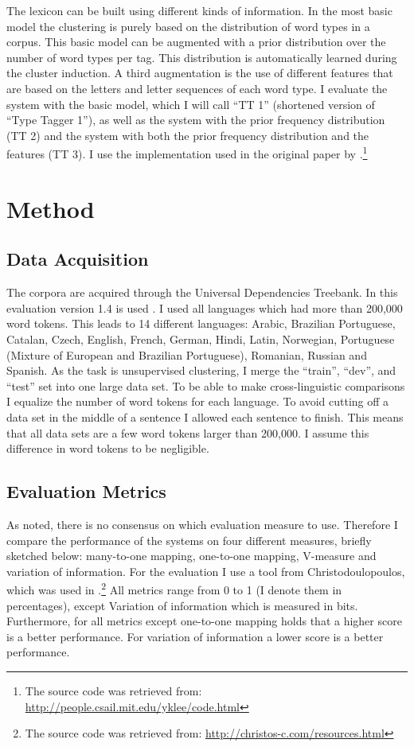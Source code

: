 \documentclass[11pt]{article}
\begin{document}
{The lexicon can be built using different kinds of information. In the most basic model the clustering is purely based on the distribution of word types in a corpus. This basic model can be augmented with a prior distribution over the number of word types per tag. This distribution is automatically learned during the cluster induction. A third augmentation is the use of different features that are based on the letters and letter sequences of each word type. I evaluate the system with the basic model, which I will call ``TT 1'' (shortened version of ``Type Tagger 1''), as well as the system with the prior frequency distribution (TT 2) and the system with both the prior frequency distribution and the features (TT 3). I use the implementation used in the original paper by \cite{lee2010simple}.\footnote{The source code was retrieved from: \url{http://people.csail.mit.edu/yklee/code.html}}

\section{Method}\label{method}
\subsection{Data Acquisition}
The corpora are acquired through the Universal Dependencies Treebank. In this evaluation version 1.4 is used \citep{11234/1-1827}. I used all languages which had more than 200,000 word tokens. This leads to 14 different languages: Arabic, Brazilian Portuguese, Catalan, Czech, English, French, German, Hindi, Latin, Norwegian, Portuguese (Mixture of European and Brazilian Portuguese), Romanian, Russian and Spanish. As the task is unsupervised clustering, I merge the ``train'', ``dev'', and ``test'' set into one large data set. To be able to make cross-linguistic comparisons I equalize the number of word tokens for each language. To avoid cutting off a data set in the middle of a sentence I allowed each sentence to finish. This means that all data sets are a few word tokens larger than 200,000. I assume this difference in word tokens to be negligible.

\subsection{Evaluation Metrics} \label{evalmetr}
As \cite{christodoulopoulos2010} noted, there is no consensus on which evaluation measure to use. Therefore I compare the performance of the systems on four different measures, briefly sketched below: many-to-one mapping, one-to-one mapping, V-measure and variation of information. For the evaluation I use a tool from Christodoulopoulos, which was used in \citep{christodoulopoulos2010}.\footnote{The source code was retrieved from: \url{http://christos-c.com/resources.html}} All metrics range from 0 to 1 (I denote them in percentages), except Variation of information which is measured in bits. Furthermore, for all metrics except one-to-one mapping holds that a higher score is a better performance. For variation of information a lower score is a better performance.

}
\end{document}
